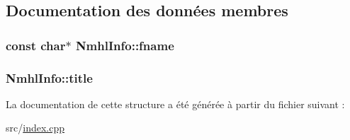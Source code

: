 \subsection{Documentation des données membres}
\hypertarget{struct_nmhl_info_a065740eda2e359636dff74500e473095}{}
\subsubsection[{fname}]{\setlength{\rightskip}{0pt plus 5cm}const char$\ast$ Nmhl\+Info\+::fname}\label{struct_nmhl_info_a065740eda2e359636dff74500e473095}
\hypertarget{struct_nmhl_info_a4be729683c2b5b82be22d86c2c72739d}{}
\subsubsection[{title}]{ Nmhl\+Info\+::title}\label{struct_nmhl_info_a4be729683c2b5b82be22d86c2c72739d}


La documentation de cette structure a été générée à partir du fichier suivant \+:\begin{DoxyCompactItemize}
\item 
src/\hyperlink{index_8cpp}{index.\+cpp}\end{DoxyCompactItemize}
